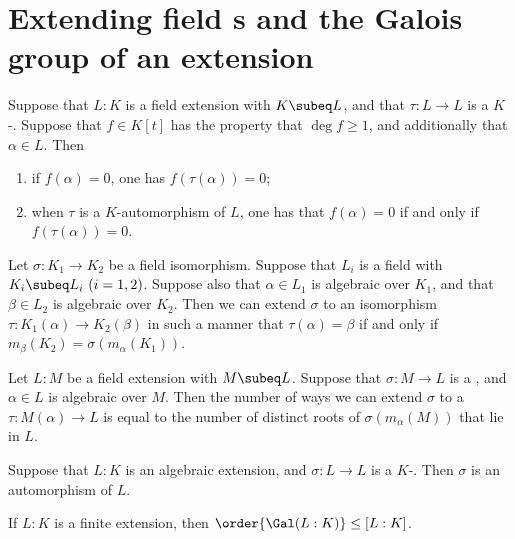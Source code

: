 \documentclass{article}
\begin{document}
\section{Extending field \homo s and the Galois group of an extension}
  \begin{tproposition}
    Suppose that \( L:K \) is a field extension with \( K\subeq L \), and that \( \tau:L\to L \) is a \( K \)-\homo. Suppose that \( f\in K[t] \) has the property that \( \deg f\geq 1 \), and additionally that \( \alpha\in L \). Then
    \begin{enumerate}[label=(\roman*)]
      \item if \( f(\alpha)=0 \), one has \( f(\tau(\alpha))=0 \);
      \item when \( \tau \) is a \( K \)-automorphism of \( L \), one has that \( f(\alpha)=0 \) if and only if \( f(\tau(\alpha))=0 \).
    \end{enumerate}
  \end{tproposition}

  \begin{ttheorem}
    Let \( \sigma:K_1\to K_2 \) be a field isomorphism. Suppose that \( L_i \) is a field with \( K_i\subeq L_i\ (i=1,2) \). Suppose also that \( \alpha\in L_1 \) is algebraic over \( K_1 \), and that \( \beta\in L_2 \) is algebraic over \( K_2 \). Then we can extend \( \sigma \) to an isomorphism \( \tau:K_1(\alpha)\to K_2(\beta) \) in such a manner that \( \tau(\alpha)=\beta \) if and only if \( m_\beta(K_2)=\sigma(m_\alpha(K_1)) \).
  \end{ttheorem}

  \begin{tcorollary}
    Let \( L:M \) be a field extension with \( M\subeq L \). Suppose that \( \sigma:M\to L \) is a \homo, and \( \alpha\in L \) is algebraic over \( M \). Then the number of ways we can extend \( \sigma \) to a \homo~\( \tau:M(\alpha)\to L \) is equal to the number of distinct roots of \( \sigma(m_\alpha(M)) \) that lie in \( L \).
  \end{tcorollary}

  \begin{ttheorem}
    Suppose that \( L:K \) is an algebraic extension, and \( \sigma:L\to L \) is a \( K \)-\homo. Then \( \sigma \) is an automorphism of \( L \).
  \end{ttheorem}

  \begin{ttheorem}
    If \( L:K \) is a finite extension, then \( \order{\Gal(L:K)}\leq [L:K] \).
  \end{ttheorem}
\end{document}
